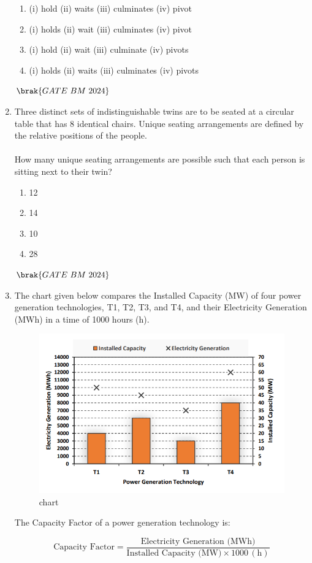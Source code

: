 \documentclass[journal,12pt,onecolumn]{IEEEtran}
\theoremstyle{remark}
\begin{document}
\begin{enumerate}
\begin{enumerate}[label=(\Alph*)]
    \item (i) hold \quad (ii) waits \quad (iii) culminates \quad (iv) pivot
    \item (i) holds \quad (ii) wait \quad (iii) culminates \quad (iv) pivot
    \item (i) hold \quad (ii) wait \quad (iii) culminate \quad (iv) pivots
    \item (i) holds \quad (ii) waits \quad (iii) culminates \quad (iv) pivots
\end{enumerate}
\hfill $\brak{GATE\ BM\ 2024}$

\item Three distinct sets of indistinguishable twins are to be seated at a circular table that
has 8 identical chairs. Unique seating arrangements are defined by the relative
positions of the people.\\
\\How many unique seating arrangements are possible such that each person is sitting
next to their twin?
\begin{enumerate}[label=(\Alph*)]
    \item 12
    \item 14
    \item 10
    \item 28
\end{enumerate}
\hfill $\brak{GATE\ BM\ 2024}$    

\item The chart given below compares the Installed Capacity (MW) of four power generation technologies, T1, T2, T3, and T4, and their Electricity Generation (MWh) in a time of 1000 hours (h).  

\begin{figure}[H]
\centering
\includegraphics[width=0.4\columnwidth]{Figs/fig 1.png}
\caption{chart}
\label{fig:placeholder}
\end{figure}

The Capacity Factor of a power generation technology is:  

\[
\text{Capacity Factor} = \frac{\text{Electricity Generation (MWh)}}{\text{Installed Capacity (MW)} \times 1000 \, (\text{h})}
\]


\end{enumerate}
\end{document}
